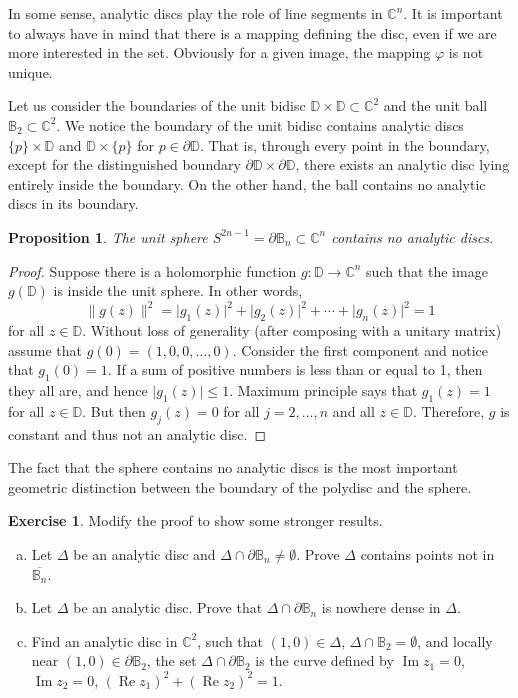 \documentclass[12pt,openany]{book}
\renewcommand{\Re}{\operatorname{Re}}
\renewcommand{\Im}{\operatorname{Im}}
\newcommand{\sabs}[1]{\lvert {#1} \rvert}
\newcommand{\snorm}[1]{\lVert {#1} \rVert}
\newcommand{\C}{{\mathbb{C}}}
\newcommand{\D}{{\mathbb{D}}}
\newcommand{\bB}{{\mathbb{B}}}
\theoremstyle{plain}
\newtheorem{prop}[thm]{Proposition}
\theoremstyle{remark}
\theoremstyle{definition}
\newenvironment{exbox}{%
    \def\FrameCommand{\vrule width 1pt \relax\hspace{10pt}}%
    \MakeFramed {\advance \hsize -\width \FrameRestore}%
}{%
    \endMakeFramed
}
\newenvironment{exparts}{%
    \leavevmode\begin{enumerate}[a),noitemsep,topsep=0pt,parsep=0pt,partopsep=0pt]
}{%
    \end{enumerate}
}
\theoremstyle{exercise}
\newtheorem{exercise}{Exercise}[section]
\theoremstyle{example}
\begin{document}
In some sense, analytic discs play the role of line segments in $\C^n$.  It
is important to always have in mind that there is a mapping defining the
disc, even if we are more interested in the set.  Obviously for a given
image, the mapping $\varphi$ is not unique.

Let us consider the boundaries of 
the unit bidisc $\D \times \D \subset \C^2$
and the unit ball $\bB_2 \subset \C^2$.  We notice the boundary
of the unit bidisc contains analytic discs $\{p\} \times \D$
and $\D \times \{p\}$ for $p \in \partial \D$.  That is, through
every point in the boundary, except for the distinguished
boundary $\partial \D \times \partial \D$, there exists an analytic disc
lying entirely inside the boundary.  On the other hand, the ball
contains no analytic discs in its boundary.

\begin{prop}
%
The unit sphere $S^{2n-1} = \partial \bB_n \subset \C^n$ 
contains no analytic discs.
\end{prop}

\begin{proof}
Suppose there is a holomorphic function $g \colon \D \to \C^n$
such that the image $g(\D)$ is inside the unit sphere.  In other words,
\begin{equation*}
\snorm{g(z)}^2 = \sabs{g_1(z)}^2 + \sabs{g_2(z)}^2 + \cdots + \sabs{g_n(z)}^2 = 1
\end{equation*}
for all $z \in \D$.  Without loss of generality (after composing with a
unitary matrix) assume that
$g(0) = (1,0,0,\ldots,0)$.  Consider the first component
and notice that $g_1(0) = 1$.  If a sum of
positive numbers is less than or equal to 1,
then they all are, and hence $\sabs{g_1(z)} \leq 1$.  Maximum principle
says
that $g_1(z) = 1$ for all $z \in \D$.  But then $g_j(z) = 0$
for all $j=2,\ldots,n$ and all $z \in \D$.  Therefore, $g$ is constant and
thus not an analytic disc.
\end{proof}

The fact that the sphere contains no analytic discs
is the most important geometric distinction between the boundary of
the polydisc and the sphere.

\begin{exbox}
\begin{exercise}
Modify the proof to show some stronger results.
\begin{exparts}
\item
Let $\Delta$ be an analytic disc
and $\Delta \cap \partial \bB_n \not= \emptyset$.
Prove $\Delta$ contains points not in
$\overline{\bB_n}$.
\item
Let $\Delta$ be an analytic disc.
Prove that $\Delta \cap \partial \bB_n$ is nowhere dense in $\Delta$.
\item
Find an analytic disc in $\C^2$, such that $(1,0) \in \Delta$, $\Delta \cap \bB_2 =
\emptyset$, and 
locally near
$(1,0) \in \partial \bB_2$, the set
$\Delta \cap \partial \bB_2$ is the
curve defined by $\Im z_1=0$, $\Im z_2=0$,
${(\Re z_1)}^2+ {(\Re z_2)}^2 = 1$.
\end{exparts}
\end{exercise}
\end{exbox}
\end{document}
